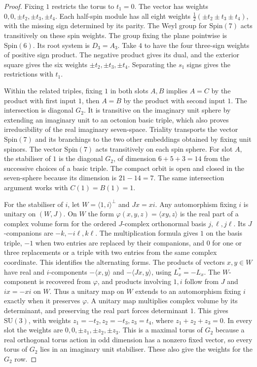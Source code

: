 \documentclass[aps,pra,onecolumn,superscriptaddress,nofootinbib,10pt]{revtex4-2}
\theoremstyle{definition}
\theoremstyle{remark}
\newcommand{\SU}{\mathrm{SU}}
\begin{document}
\begin{proof}
Fixing \(1\) restricts the torus to \(t_1=0\).
The vector has weights \(0,0,\pm t_2,\pm t_3,\pm t_4\).
Each half-spin module has all eight weights
\(\frac12(\pm t_2\pm t_3\pm t_4)\), with the missing
sign determined by its parity. The Weyl group for
\(\mathrm{Spin}(7)\) acts transitively on these spin weights.
The group fixing the plane pointwise is \(\mathrm{Spin}(6)\).
Its root system is \(D_3=A_3\). Take \(4\) to have the four
three-sign weights of positive sign product. The negative
product gives its dual, and the exterior square gives the
six weights \(\pm t_2,\pm t_3,\pm t_4\).
Separating the \(s_1\) signs gives the restrictions with \(t_1\).

Within the related triples, fixing \(1\) in both slots \(A,B\)
implies \(A=C\) by the product with first input \(1\),
then \(A=B\) by the product with second input \(1\).
The intersection is diagonal \(G_2\).
It is transitive on the imaginary unit sphere by extending
an imaginary unit to an octonion basic triple, which also proves
irreducibility of the real imaginary seven-space.
Triality transports the vector \(\mathrm{Spin}(7)\) and its
branchings to the two other embeddings obtained by fixing unit
spinors. The vector \(\mathrm{Spin}(7)\) acts transitively on
each spin sphere. For slot \(A\), the stabiliser of \(1\) is
the diagonal \(G_2\), of dimension \(6+5+3=14\) from the
successive choices of a basic triple. The compact orbit is
open and closed in the seven-sphere because its dimension
is \(21-14=7\). The same intersection argument works with
\(C(1)=B(1)=1\).

For the stabiliser of \(i\), let \(W=\langle1,i\rangle^\perp\)
and \(Jx=xi\). Any automorphism fixing \(i\) is unitary on
\((W,J)\). On \(W\) the form \(\varphi(x,y,z)=\langle xy,z\rangle\)
is the real part of a complex volume form for the ordered
\(J\)-complex orthonormal basis \(j,\ell,j\ell\).
Its \(J\)-companions are \(-k,-i\ell,k\ell\).
The multiplication formula gives \(1\) on the basis triple,
\(-1\) when two entries are replaced by their companions,
and \(0\) for one or three replacements or a triple with two
entries from the same complex coordinate. This identifies the
alternating forms. The products of vectors \(x,y\in W\)
have real and \(i\)-components
\(-\langle x,y\rangle\) and \(-\langle Jx,y\rangle\),
using \(L_x^*=-L_x\). The \(W\)-component is recovered from
\(\varphi\), and products involving \(1,i\) follow from \(J\)
and \(ix=-xi\) on \(W\).
Thus a unitary map on \(W\) extends to an automorphism fixing
\(i\) exactly when it preserves \(\varphi\).
A unitary map multiplies complex volume by its determinant,
and preserving the real part forces determinant \(1\).
This gives \(\SU(3)\), with weights
\(z_1=-t_2,z_2=-t_3,z_3=t_4\), where \(z_1+z_2+z_3=0\).
In every slot the weights are \(0,0,\pm z_1,\pm z_2,\pm z_3\).
This is a maximal torus of \(G_2\) because a real orthogonal torus
action in odd dimension has a nonzero fixed vector, so every
torus of \(G_2\) lies in an imaginary unit stabiliser.
These also give the weights for the \(G_2\) row.
\end{proof}
\end{document}
